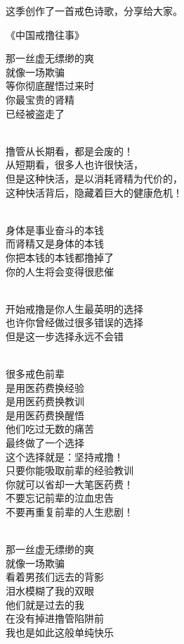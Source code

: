 \documentclass{ctexart}
\begin{document}
这季创作了一首戒色诗歌，分享给大家。

\begin{center}
    《中国戒撸往事》\it
    \begin{multicols}{2}
        那一丝虚无缥缈的爽 \\ 就像一场欺骗 \\ 等你彻底醒悟过来时 \\ 你最宝贵的肾精 \\ 已经被盗走了

        ~\\

        撸管从长期看，都是会废的！ \\ 从短期看，很多人也许很快活， \\ 但是这种快活，是以消耗肾精为代价的， \\ 这种快活背后，隐藏着巨大的健康危机！

        ~\\

        身体是事业奋斗的本钱 \\ 而肾精又是身体的本钱 \\ 你把本钱的本钱都撸掉了 \\ 你的人生将会变得很悲催

        ~\\

        开始戒撸是你人生最英明的选择 \\ 也许你曾经做过很多错误的选择 \\ 但是这一步选择永远不会错

        ~\\

        很多戒色前辈 \\ 是用医药费换经验 \\ 是用医药费换教训 \\ 是用医药费换醒悟 \\ 他们吃过无数的痛苦 \\ 最终做了一个选择 \\ 这个选择就是：坚持戒撸！ \\ 只要你能吸取前辈的经验教训 \\ 你就可以省却一大笔医药费！ \\ 不要忘记前辈的泣血忠告 \\ 不要再重复前辈的人生悲剧！

        ~\\

        那一丝虚无缥缈的爽 \\ 就像一场欺骗 \\ 看着男孩们远去的背影 \\ 泪水模糊了我的双眼 \\ 他们就是过去的我 \\ 在没有掉进撸管陷阱前 \\ 我也是如此这般单纯快乐


\end{multicols}
\end{center}
\end{document}

